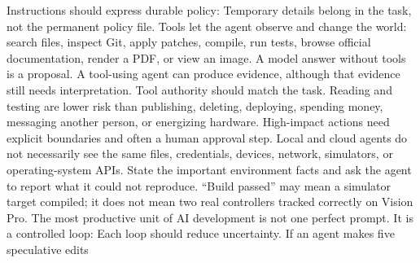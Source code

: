 {}Instructions should express durable policy:\markdownRendererInterblockSeparator
{}\markdownRendererInterblockSeparator
{}Temporary details belong in the task, not the permanent policy file.\markdownRendererInterblockSeparator
{}
\markdownRendererSectionEnd \markdownRendererSectionBegin
{}\markdownRendererInterblockSeparator
{}Tools let the agent observe and change the world: search files, inspect Git,\markdownRendererSoftLineBreak
{}apply patches, compile, run tests, browse official documentation, render a PDF,\markdownRendererSoftLineBreak
{}or view an image. A model answer without tools is a proposal. A tool-using\markdownRendererSoftLineBreak
{}agent can produce evidence, although that evidence still needs interpretation.\markdownRendererParagraphSeparator
{}Tool authority should match the task. Reading and testing are lower risk than\markdownRendererSoftLineBreak
{}publishing, deleting, deploying, spending money, messaging another person, or\markdownRendererSoftLineBreak
{}energizing hardware. High-impact actions need explicit boundaries and often a\markdownRendererSoftLineBreak
{}human approval step.\markdownRendererInterblockSeparator
{}
\markdownRendererSectionEnd \markdownRendererSectionBegin
{}\markdownRendererInterblockSeparator
{}Local and cloud agents do not necessarily see the same files, credentials,\markdownRendererSoftLineBreak
{}devices, network, simulators, or operating-system APIs. State the important\markdownRendererSoftLineBreak
{}environment facts and ask the agent to report what it could not reproduce.\markdownRendererSoftLineBreak
{}“Build passed” may mean a simulator target compiled; it does not mean two real\markdownRendererSoftLineBreak
{}controllers tracked correctly on Vision Pro.\markdownRendererInterblockSeparator
{}
\markdownRendererSectionEnd \markdownRendererSectionBegin
{}\markdownRendererInterblockSeparator
{}The most productive unit of AI development is not one perfect prompt. It is a\markdownRendererSoftLineBreak
{}controlled loop:\markdownRendererInterblockSeparator
{}\markdownRendererInterblockSeparator
{}Each loop should reduce uncertainty. If an agent makes five speculative edits\markdownRendererSoftLineBreak
